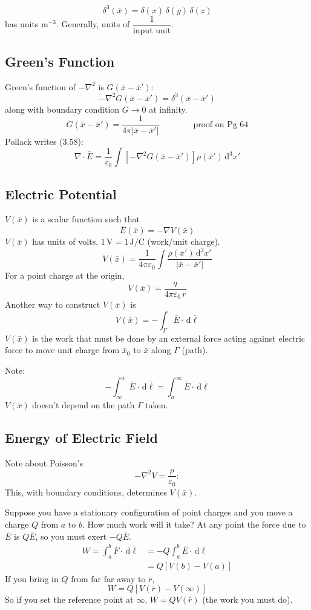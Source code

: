 \documentclass[11pt]{article}
\newcommand{\eps}{\varepsilon_0}
\newcommand{\dd}{\,\mathrm{d}}
\begin{document}
\[
  \delta^3(\bar{x}) = \delta(x)\,\delta(y)\,\delta(z)
\]
has units $\mathrm{m}^{-3}$. Generally, units of $\dfrac{1}{\text{input unit}}$.

\subsection{Green's Function}

Green's function of $-\nabla^2$ is $G(\bar{x}-\bar{x}')$:
\[
  -\nabla^2G(\bar{x}-\bar{x}') = \delta^3(\bar{x}-\bar{x}')
\]
along with boundary condition $G\to0$ at infinity.
\[
  G(\bar{x}-\bar{x}') = \frac{1}{4\pi|\bar{x}-\bar{x}'|}
  \qquad\qquad \text{proof on Pg 64}
\]
Pollack writes (3.58):
\[
  \nabla\cdot\bar{E} = \frac{1}{\eps}\int\left[-\nabla^2G(\bar{x}-\bar{x}')\right]\rho(\bar{x}')\dd^3x'
\]

\subsection{Electric Potential}

$V(\bar{x})$ is a scalar function such that
\[
  \bar{E}(\bar{x}) = -\nabla V(\bar{x})
\]
$V(\bar{x})$ has units of volts, $1\,\mathrm{V} = 1\,\mathrm{J/C}$ (work/unit charge).
\[
  V(\bar{x}) = \frac{1}{4\pi\eps}\int\frac{\rho(\bar{x}')\dd^3x'}{|\bar{x}-\bar{x}'|}
\]
For a point charge at the origin,
\[
  V(\bar{x}) = \frac{q}{4\pi\eps\,r}
\]
Another way to construct $V(\bar{x})$ is
\[
  V(\bar{x}) = -\int_\Gamma\bar{E}\cdot\dd\bar{\ell}
\]
$V(\bar{x})$ is the work that must be done by an external force acting against electric force to move unit charge from $\bar{x}_0$ to $\bar{x}$ along $\Gamma$ (path).

Note:
\[
  -\int_{\infty}^{a}\bar{E}\cdot\dd\bar{\ell} = \int_{a}^{\infty}\bar{E}\cdot\dd\bar{\ell}
\]
$V(\bar{x})$ doesn't depend on the path $\Gamma$ taken.

\subsection{Energy of Electric Field}

Note about Poisson's
\[
  -\nabla^2V = \frac{\rho}{\eps}:
\]
This, with boundary conditions, determines $V(\bar{x})$.

Suppose you have a stationary configuration of point charges and you move a charge $Q$ from $a$ to $b$. How much work will it take? At any point the force due to $\bar{E}$ is $Q\bar{E}$, so you must exert $-Q\bar{E}$.
\begin{align*}
  W = \int_a^b\bar{F}\cdot\dd\bar{\ell} &= -Q\int_a^b\bar{E}\cdot\dd\bar{\ell}\\
  &= Q\left[V(b)-V(a)\right]
\end{align*}
If you bring in $Q$ from far far away to $\bar{r}$,
\[
  W = Q\left[V(\bar{r})-V(\infty)\right]
\]
So if you set the reference point at $\infty$, $W=QV(\bar{r})$ (the work you must do).
\end{document}
